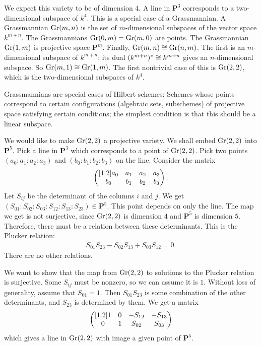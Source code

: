 \documentclass [11 pt, oneside, margin = 1 in] {article}
\begin{document}
\begin{example}\label{}\text{}
We expect this variety to be of dimension $4$. A line in $\mathbf{P}^3$ corresponds to a two-dimensional subspace of $k^4$. This is a special case of a Grassmannian. A Grassmannian $\operatorname{Gr}(m,n)$ is the set of $m$-dimensional subspaces of the vector space $k^{m+n}$. The Grassmannians $\operatorname{Gr}(0,m)=\operatorname{Gr} (m,0)$ are points. The Grassmannian $\operatorname{Gr}(1,m)$ is projective space $\mathbf{P}^m$. Finally, $\operatorname{Gr}(m,n)\cong \operatorname{Gr} (n,m)$. The first is an $m$-dimensional subspace of $k^{m+n}$; its dual $(k^{m+n})^*\cong k^{m+n}$ gives an $n$-dimensional subspace. So $\operatorname{Gr}(m,1)\cong \operatorname{Gr}(1,m)$. The first nontrivial case of this is $\operatorname{Gr}(2,2)$, which is the two-dimensional subspaces of $k^4$.

Grassmannians are special cases of Hilbert schemes: Schemes whose points correspond to certain configurations (algebraic sets, subschemes) of projective space satisfying certain conditions; the simplest condition is that this should be a linear subspace.

We would like to make $\operatorname{Gr}(2,2)$ a projective variety. We shall embed $\operatorname{Gr}(2,2)$ into $\mathbf{P}^5$. Pick a line in $\mathbf{P}^3$ which corresponds to a point of $\operatorname{Gr}(2,2)$. Pick two points $(a_0:a_1:a_2:a_3)$ and $(b_0:b_1:b_2:b_3)$ on the line. Consider the matrix
\begin{align*}
	\begin{pmatrix} [ 1.2 ] a_0&a_1&a_2&a_3\\b_0&b_1&b_2&b_3\end{pmatrix}.
\end{align*}
Let $S_{ij}$ be the determinant of the columns $i$ and $j$. We get $(S_{01}:S_{02}:S_{03}:S_{12}:S_{13}:S_{23}) \in \mathbf{P}^5$. This point depends on only the line. The map we get is not surjective, since $\operatorname{Gr}(2,2)$ is dimension $4$ and $\mathbf{P}^5$ is dimension $5$. Therefore, there must be a relation between these determinants. This is the Plucker relation:
\begin{align*}
	S_{01}S_{23}-S_{02}S_{13}+S_{03}S_{12}=0.
\end{align*}
There are no other relations.

We want to show that the map from $\operatorname{Gr}(2,2)$ to solutions to the Plucker relation is surjective. Some $S_{ij}$ must be nonzero, so we can assume it is $1$. Without loss of generality, assume that $S_{01}=1$. Then $S_{01}S_{23}$ is some combination of the other determinants, and $S_{23}$ is determined by them. We get a matrix
\begin{align*}
	\begin{pmatrix} [ 1.2 ] 1&0&-S_{12}&-S_{13}\\0&1&S_{02}&S_{03}\end{pmatrix}
\end{align*}
which gives a line in $\operatorname{Gr}(2,2)$ with image a given point of $\mathbf{P}^5$.
\end{example}
\end{document}
